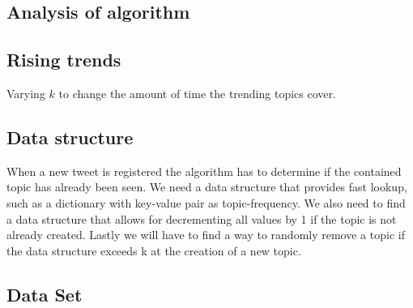 \subsection{Analysis of algorithm}



\subsection{Rising trends}
Varying $k$ to change the amount of time the trending topics cover.

\subsection{Data structure}
When a new tweet is registered the algorithm has to determine if the contained topic has already been seen. We need a data structure that provides fast lookup, such as a dictionary with key-value pair as topic-frequency. We also need to find a data structure that allows for decrementing all values by 1 if the topic is not already created. Lastly we will have to find a way to randomly remove a topic if the data structure exceeds k at the creation of a new topic.

\subsection{Data Set}